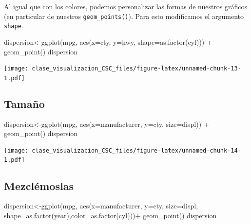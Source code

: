\documentclass[
]{book}
\newenvironment{Shaded}{\begin{snugshade}}{\end{snugshade}}
\newcommand{\AttributeTok}[1]{\textcolor[rgb]{0.77,0.63,0.00}{#1}}
\newcommand{\FunctionTok}[1]{\textcolor[rgb]{0.00,0.00,0.00}{#1}}
\newcommand{\NormalTok}[1]{#1}
\newcommand{\OtherTok}[1]{\textcolor[rgb]{0.56,0.35,0.01}{#1}}
\newcommand{\SpecialCharTok}[1]{\textcolor[rgb]{0.00,0.00,0.00}{#1}}
\begin{document}
Al igual que con los colores, podemos personalizar las formas de nuestros gráficos (en particular de nuestros \texttt{geom\_points()}). Para esto modificamos el argumento \texttt{shape}.

\begin{Shaded}
\begin{Highlighting}[]
\NormalTok{dispersion}\OtherTok{\textless{}{-}}\FunctionTok{ggplot}\NormalTok{(mpg, }\FunctionTok{aes}\NormalTok{(}\AttributeTok{x=}\NormalTok{cty, }\AttributeTok{y=}\NormalTok{hwy, }\AttributeTok{shape=}\FunctionTok{as.factor}\NormalTok{(cyl))) }\SpecialCharTok{+} 
    \FunctionTok{geom\_point}\NormalTok{()}
\NormalTok{dispersion}
\end{Highlighting}
\end{Shaded}

\texttt{[image: clase\_visualizacion\_CSC\_files/figure-latex/unnamed-chunk-13-1.pdf]}

\hypertarget{tamauxf1o}{%
\subsection{Tamaño}\label{tamauxf1o}}

\begin{Shaded}
\begin{Highlighting}[]
\NormalTok{dispersion}\OtherTok{\textless{}{-}}\FunctionTok{ggplot}\NormalTok{(mpg, }\FunctionTok{aes}\NormalTok{(}\AttributeTok{x=}\NormalTok{manufacturer, }\AttributeTok{y=}\NormalTok{cty, }\AttributeTok{size=}\NormalTok{displ)) }\SpecialCharTok{+} 
    \FunctionTok{geom\_point}\NormalTok{()}
\NormalTok{dispersion}
\end{Highlighting}
\end{Shaded}

\texttt{[image: clase\_visualizacion\_CSC\_files/figure-latex/unnamed-chunk-14-1.pdf]}

\hypertarget{mezcluxe9moslas}{%
\subsection{Mezclémoslas}\label{mezcluxe9moslas}}

\begin{Shaded}
\begin{Highlighting}[]
\NormalTok{dispersion}\OtherTok{\textless{}{-}}\FunctionTok{ggplot}\NormalTok{(mpg, }\FunctionTok{aes}\NormalTok{(}\AttributeTok{x=}\NormalTok{manufacturer, }\AttributeTok{y=}\NormalTok{cty, }\AttributeTok{size=}\NormalTok{displ, }\AttributeTok{shape=}\FunctionTok{as.factor}\NormalTok{(year),}\AttributeTok{color=}\FunctionTok{as.factor}\NormalTok{(cyl)))}\SpecialCharTok{+}
  \FunctionTok{geom\_point}\NormalTok{()}
\NormalTok{dispersion}
\end{Highlighting}
\end{Shaded}
\end{document}
